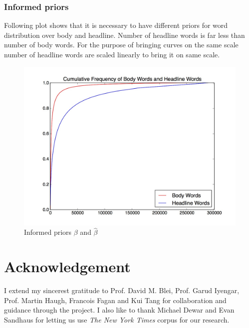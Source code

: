 \documentclass[a4paper]{article}
\begin{document}
\subsubsection{Informed priors}
Following plot shows that it is necessary to have different priors for word distribution over body and headline. Number of headline words is far less than number of body words. For the purpose of bringing curves on the same scale number of headline words are scaled linearly to bring it on same scale.
\begin{figure}[ht]
		\begin{center}
		\includegraphics[width=\columnwidth]{plot.jpeg}
		\caption{Informed priors $\beta$ and $\hat{\beta}$}
		\label{fig: priors}
		\end{center}
\end{figure}

\section*{Acknowledgement} 
I extend my sincerest gratitude to Prof. David M. Blei, Prof. Garud Iyengar, Prof. Martin Haugh, Francois Fagan and Kui Tang for collaboration and guidance through the project. I also like to thank Michael Dewar and Evan Sandhaus for letting us use \emph{The New York Times} corpus for our research. 


{}

\end{document}
